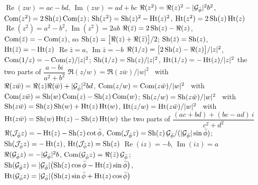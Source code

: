 \begin{gnlawswide}
  {$\operatorname{Re}(zw) = ac - bd$, \newline $\operatorname{Im}(zw) = ad + bc$}
  {$\Re(z^2) = \Re(z)^2 - |\Gp|^2 b^2$, \quad $\Com(z^2) = 2\Sh(z)\Com(z)$; \newline $\Sh(z^2) = \Sh(z)^2 - \Ht(z)^2$, \quad $\Ht(z^2) = 2\Sh(z)\Ht(z)$}
  {$\operatorname{Re}(z^2) = a^2 - b^2$, \newline $\operatorname{Im}(z^2) = 2ab$}
  {$\Re(\bar{z}) = 2\Sh(z) - \Re(z)$, \quad $\Com(\bar{z}) = -\Com(z)$, \newline so $\Sh(z) = \bigl[\Re(z) + \Re(\bar{z})\bigr]/2$; \newline $\Sh(\bar{z}) = \Sh(z)$, \quad $\Ht(\bar{z}) = -\Ht(z)$}
  {$\operatorname{Re}\bar{z} = a$, \newline $\operatorname{Im}\bar{z} = -b$}
  {$\Re(1/z) = \bigl[2\Sh(z) - \Re(z)\bigr]/|z|^2$, \quad $\Com(1/z) = -\Com(z)/|z|^2$; \newline $\Sh(1/z) = \Sh(z)/|z|^2$, \quad $\Ht(1/z) = -\Ht(z)/|z|^2$}
  {the two parts of \newline $\dfrac{a - bi}{a^2 + b^2}$}
  {$\Re(z/w) = \Re(z\bar{w})/|w|^2$ \ with \ $\Re(z\bar{w}) = \Re(z)\Re(\bar{w}) + |\Gp|^2 bd$, \newline $\Com(z/w) = \Com(z\bar{w})/|w|^2$ \ with \ $\Com(z\bar{w}) = \Sh(w)\Com(z) - \Sh(z)\Com(w)$; \newline $\Sh(z/w) = \Sh(z\bar{w})/|w|^2$ \ with \ $\Sh(z\bar{w}) = \Sh(z)\Sh(w) + \Ht(z)\Ht(w)$, \newline $\Ht(z/w) = \Ht(z\bar{w})/|w|^2$ \ with \ $\Ht(z\bar{w}) = \Sh(w)\Ht(z) - \Sh(z)\Ht(w)$}
  {the two parts of \newline $\dfrac{(ac + bd) + (bc - ad)\,i}{c^2 + d^2}$}
  {$\Re(\Jp z) = -\Ht(z) - \Sh(z)\cot\pb$, \quad $\Com(\Jp z) = \Sh(z)\,\Gp/(|\Gp|\sin\pb)$; \newline $\Sh(\Jp z) = -\Ht(z)$, \quad $\Ht(\Jp z) = \Sh(z)$}
  {$\operatorname{Re}(iz) = -b$, \newline $\operatorname{Im}(iz) = a$}
  {$\Re(\Gp z) = -|\Gp|^2 b$, \quad $\Com(\Gp z) = \Re(\bar{z})\,\Gp$; \newline $\Sh(\Gp z) = |\Gp|\bigl(\Sh(z)\cos\pb - \Ht(z)\sin\pb\bigr)$, \newline $\Ht(\Gp z) = |\Gp|\bigl(\Sh(z)\sin\pb + \Ht(z)\cos\pb\bigr)$}

\end{gnlawswide}
